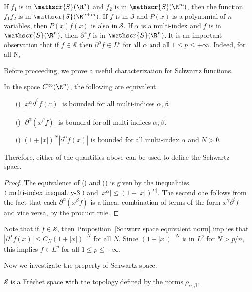 \begin{example}
If $f_1$ is in $\mathscr{S}(\R^n)$ and $f_2$ is in $\mathscr{S}(\R^m)$, then the function $f_1f_2$ is in $\mathscr{S}(\R^{n+m})$. If $f$ is in $\mathscr{S}$ and $P(x)$ is a polynomial of $n$ variables, then $P(x)f(x)$ is also in $\mathscr{S}$. If $\alpha$ is a multi-index and $f$ is in $\mathscr{S}(\R^n)$, then $\partial^\alpha f$ is in $\mathscr{S}(\R^n)$. It is an important observation that if $f\in\mathscr{S}$ then $\partial^\alpha f\in L^p$ for all $\alpha$ and all $1\leq p\leq+\infty$. Indeed,  for all N,
\end{example}
Before proceeding, we prove a useful characterization for Schwartz functions.
\begin{proposition}\label{Schwarz space equivalent norm}
In the space $C^\infty(\R^n)$, the following are equivalent.
\begin{itemize}
\item[(\rmnum{1})] $|x^\alpha\partial^\beta f(x)|$ is bounded for all multi-indices $\alpha,\beta$.
\item[(\rmnum{2})] $|\partial^\alpha(x^\beta f)|$ is bounded for all multi-indices $\alpha,\beta$.
\item[(\rmnum{3})] $(1+|x|)^N|\partial^\alpha f(x)|$ is bounded for all multi-index $\alpha$ and $N>0$.
\end{itemize}
Therefore, either of the quantities above can be used to define the Schwartz space.
\end{proposition}
\begin{proof}
The equivalence of () and () is given by the inequalities $(\ref{multi-index inequality-3})$ and $|x^\alpha|\leq(1+|x|)^{|\alpha|}$. The second one follows from the fact that each $\partial^\alpha(x^\beta f)$ is a linear combination of terms of the form $x^\gamma\partial^\delta f$ and vice versa, by the product rule.
\end{proof}
Note that if $f\in\mathscr{S}$, then Proposition~\ref{Schwarz space equivalent norm} implies that $|\partial^\alpha f(x)|\leq C_N(1+|x|)^{-N}$ for all $N$. Since $(1+|x|)^{-N}$ is in $L^p$ for $N>p/n$, this implies $f\in L^p$ for all $1\leq p\leq+\infty$.\par
Now we investigate the property of Schwartz space.
\begin{proposition}
$\mathscr{S}$ is a Fr\'echet space with the topology defined by the norms $\rho_{\alpha,\beta}$.
\end{proposition}
